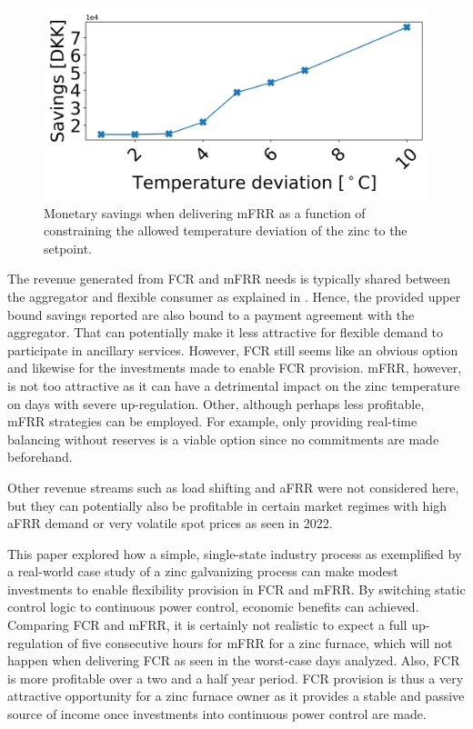 \documentclass[lettersize,journal]{IEEEtran}
\begin{document}
\begin{figure}[t]
    \centering
    \includegraphics[width=\columnwidth]{figures/profit_vs_delta_temp_mfrr_and_energy.png}
    \caption{Monetary savings when delivering mFRR as a function of constraining the allowed temperature deviation of the zinc to the setpoint.}
    \label{fig:profit_vs_delta_temp_mfrr}
\end{figure}


The revenue generated from FCR and mFRR needs is typically shared between the aggregator and flexible consumer as explained in \cite{gade2022ecosystem}. Hence, the provided upper bound savings reported are also bound to a payment agreement with the aggregator. That can potentially make it less attractive for flexible demand to participate in ancillary services. However, FCR still seems like an obvious option and likewise for the investments made to enable FCR provision. mFRR, however, is not too attractive as it can have a detrimental impact on the zinc temperature on days with severe up-regulation. Other, although perhaps less profitable, mFRR strategies can be employed. For example, only providing real-time balancing without reserves is a viable option since no commitments are made beforehand.

Other revenue streams such as load shifting and aFRR were not considered here, but they can potentially also be profitable in certain market regimes with high aFRR demand or very volatile spot prices as seen in 2022.



This paper explored how a simple, single-state industry process as exemplified by a real-world case study of a zinc galvanizing process can make modest investments to enable flexibility provision in FCR and mFRR. By switching static control logic to continuous power control, economic benefits can achieved. Comparing FCR and mFRR, it is certainly not realistic to expect a full up-regulation of five consecutive hours for mFRR for a zinc furnace, which will not happen when delivering FCR as seen in the worst-case days analyzed. Also, FCR is more profitable over a two and a half year period. FCR provision is thus a very attractive opportunity for a zinc furnace owner as it provides a stable and passive source of income once investments into continuous power control are made.
\end{document}

